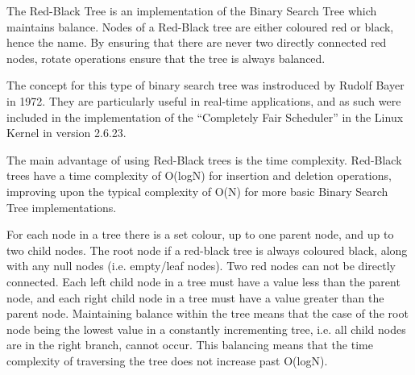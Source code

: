 The Red-Black Tree is an implementation of the Binary Search Tree which
maintains balance. Nodes of a Red-Black tree are either coloured red or black,
hence the name. By ensuring that there are never two directly connected red
nodes, rotate operations ensure that the tree is always balanced.

The concept for this type of binary search tree was instroduced by Rudolf Bayer
in 1972\cite{wpedia}. They are particularly useful in real-time applications, and as such
were included in the implementation of the ``Completely Fair Scheduler'' in the
Linux Kernel in version 2.6.23.

The main advantage of using Red-Black trees is the time complexity. Red-Black
trees have a time complexity of O(logN) for insertion and deletion operations,
improving upon the typical complexity of O(N) for more basic Binary Search Tree
implementations\cite{wpedia}.

For each node in a tree there is a set colour, up to one parent node, and up to
two child nodes. The root node if a red-black tree is always coloured black,
along with any null nodes (i.e. empty/leaf nodes). Two red nodes can not be
directly connected\cite{geeksIntro}. Each left child node in a tree must
have a value less than the parent node, and each right child node in a tree must
have a value greater than the parent node. Maintaining balance within the tree
means that the case of the root node being the lowest value in a constantly
incrementing tree, i.e. all child nodes are in the right branch, cannot occur.
This balancing means that the time complexity of traversing the tree does not
increase past O(logN).
